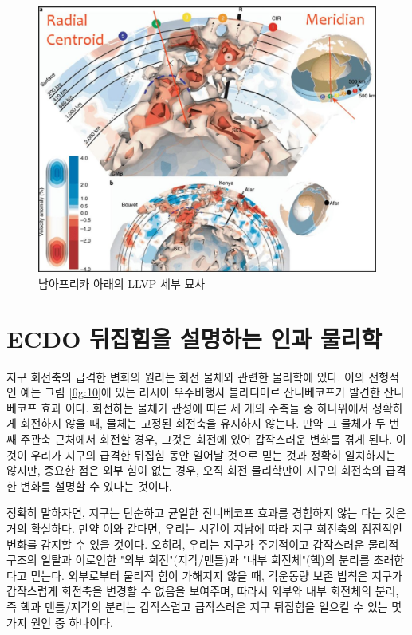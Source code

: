 \documentclass[10pt,twocolumn,letterpaper]{article}
\begin{document}
\begin{figure}[t]
\begin{center}
   \includegraphics[width=1\linewidth]{llvp.jpg}
\end{center}
   \caption{남아프리카 아래의 LLVP 세부 묘사 \cite{28}}
\label{fig:12}
\label{fig:onecol}
\end{figure}

\section{ECDO 뒤집힘을 설명하는 인과 물리학}

지구 회전축의 급격한 변화의 원리는 회전 물체와 관련한 물리학에 있다. 이의 전형적인 예는  그림 \ref{fig:10}에 있는 러시아 우주비행사 블라디미르 잔니베코프가 발견한 잔니베코프 효과 \cite{37}이다. 회전하는 물체가 관성에 따른 세 개의 주축들 중 하나위에서 정확하게 회전하지 않을 때, 물체는 고정된 회전축을 유지하지 않는다. 만약 그 물체가  두 번째 주관축 근처에서 회전할 경우, 그것은 회전에 있어 갑작스러운 변화를 겪게 된다. 이것이 우리가 지구의 급격한 뒤집힘 동안 일어날 것으로 믿는 것과 정확히 일치하지는 않지만, 중요한 점은 외부 힘이 없는 경우, 오직 회전 물리학만이 지구의 회전축의 급격한 변화를 설명할 수 있다는 것이다.

정확히 말하자면, 지구는 단순하고 균일한 잔니베코프 효과를 경험하지 않는 다는 것은 거의 확실하다. 만약 이와 같다면, 우리는 시간이 지남에 따라 지구 회전축의 점진적인 변화를 감지할 수 있을 것이다. 오히려, 우리는 지구가 주기적이고 갑작스러운 물리적 구조의 일탈과 이로인한 "외부 회전"(지각/맨틀)과 "내부 회전체"(핵)의 분리를 초래한다고 믿는다. 외부로부터 물리적 힘이 가해지지 않을 때, 각운동량 보존 법칙은 지구가 갑작스럽게 회전축을 변경할 수 없음을 보여주며, 따라서 외부와 내부 회전체의 분리, 즉 핵과 맨틀/지각의 분리는 갑작스럽고 급작스러운 지구 뒤집힘을 일으킬 수 있는 몇 가지 원인 중 하나이다.
\end{document}
